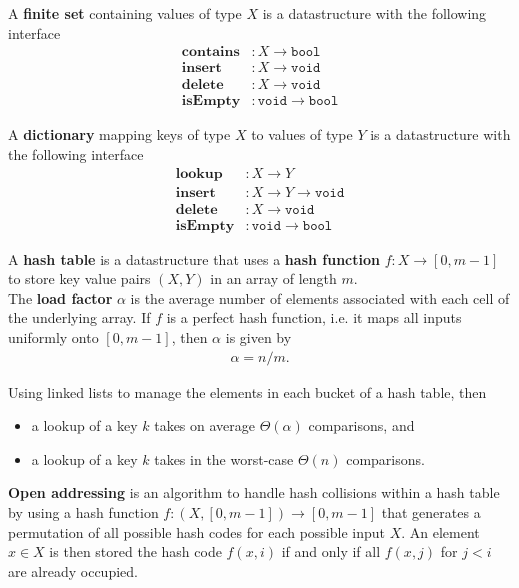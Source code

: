 \documentclass{article}
\begin{document}
\begin{definition}
	A \textbf{finite set} containing values of type $X$ is a datastructure with the following interface
	\begin{align*}
		\textbf{contains} &: X\to \texttt{bool}\\
		\textbf{insert} &: X \to \texttt{void}\\
		\textbf{delete} &: X \to \texttt{void}\\
		\textbf{isEmpty} &: \texttt{void} \to \texttt{bool}
	\end{align*}
\end{definition}
\begin{definition}
	A \textbf{dictionary} mapping keys of type $X$ to values of type $Y$
	is a datastructure with the following interface
	\begin{align*}
		\textbf{lookup} &: X \to Y\\
		\textbf{insert} &: X \to Y \to \texttt{void}\\
		\textbf{delete} &: X \to \texttt{void}\\
		\textbf{isEmpty} &: \texttt{void} \to \texttt{bool}
	\end{align*}
\end{definition}
\begin{definition}
	A \textbf{hash table} is a datastructure that uses a \textbf{hash function} $f: X \to [0,m-1]$
	to store key value pairs $(X,Y)$ in an array of length $m$.\\
	The \textbf{load factor} $\alpha$ is the average number of elements associated with each cell
	of the underlying array. If $f$ is a perfect hash function, i.e. it maps all inputs uniformly
	onto $[0,m-1]$, then $\alpha$ is given by 
	\begin{align*}
		\alpha = n / m.
	\end{align*}
\end{definition}
\begin{proposition}
	Using linked lists to manage the elements in each bucket of a hash table, then
	\begin{itemize}
		\item a lookup of a key $k$  takes on average $\Theta(\alpha)$ comparisons, and
		\item a lookup of a key $k$ takes in the worst-case $\Theta(n)$ comparisons.
	\end{itemize}
\end{proposition}
\begin{definition}
	\textbf{Open addressing} is an algorithm to handle hash collisions within a hash table 
	by using a hash function $f: (X, [0,m-1]) \to [0,m-1]$ that generates a permutation of all possible
	hash codes for each possible input $X$. An element $x\in X$ is then stored the hash code $f(x, i)$
	if and only if all $f(x,j)$ for $j < i$ are already occupied.
\end{definition}
\end{document}
